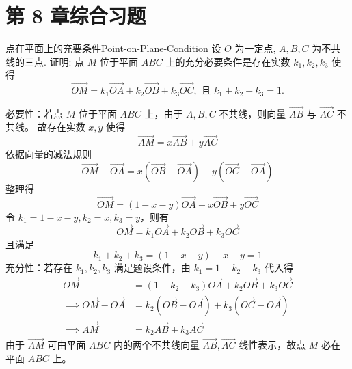 \section{第 8 章综合习题}

\begin{problem}{点在平面上的充要条件}{Point-on-Plane-Condition}
    设 $O$ 为一定点, $A, B, C$ 为不共线的三点. 证明: 点 $M$ 位于平面 $ABC$ 上的充分必要条件是存在实数 $k_1, k_2, k_3$ 使得
    \begin{equation}
        \overrightarrow{OM} = k_1\overrightarrow{OA} + k_2\overrightarrow{OB} + k_3\overrightarrow{OC}, \text{ 且 } k_1 + k_2 + k_3 = 1.
    \end{equation}
\end{problem}

\begin{myproof}
    必要性：若点 $M$ 位于平面 $ABC$ 上，由于 $A, B, C$ 不共线，则向量 $\overrightarrow{AB}$ 与 $\overrightarrow{AC}$ 不共线。
    故存在实数 $x, y$ 使得
    \begin{equation}
        \overrightarrow{AM} = x\overrightarrow{AB} + y\overrightarrow{AC}
    \end{equation}
    依据向量的减法规则
    \begin{equation}
        \overrightarrow{OM} - \overrightarrow{OA} = x(\overrightarrow{OB} - \overrightarrow{OA}) + y(\overrightarrow{OC} - \overrightarrow{OA})
    \end{equation}
    整理得
    \begin{equation}
        \overrightarrow{OM} = (1 - x - y)\overrightarrow{OA} + x\overrightarrow{OB} + y\overrightarrow{OC}
    \end{equation}
    令 $k_1 = 1 - x - y, k_2 = x, k_3 = y$，则有
    \begin{equation}
        \overrightarrow{OM} = k_1\overrightarrow{OA} + k_2\overrightarrow{OB} + k_3\overrightarrow{OC}
    \end{equation}
    且满足
    \begin{equation}
        k_1 + k_2 + k_3 = (1 - x - y) + x + y = 1
    \end{equation}
    充分性：若存在 $k_1, k_2, k_3$ 满足题设条件，由 $k_1 = 1 - k_2 - k_3$ 代入得
    \begin{equation}
        \begin{aligned}
            \overrightarrow{OM}                                & = (1 - k_2 - k_3)\overrightarrow{OA} + k_2\overrightarrow{OB} + k_3\overrightarrow{OC}            \\
            \implies \overrightarrow{OM} - \overrightarrow{OA} & = k_2(\overrightarrow{OB} - \overrightarrow{OA}) + k_3(\overrightarrow{OC} - \overrightarrow{OA}) \\
            \implies \overrightarrow{AM}                       & = k_2\overrightarrow{AB} + k_3\overrightarrow{AC}
        \end{aligned}
    \end{equation}
    由于 $\overrightarrow{AM}$ 可由平面 $ABC$ 内的两个不共线向量 $\overrightarrow{AB}, \overrightarrow{AC}$ 线性表示，故点 $M$ 必在平面 $ABC$ 上。
\end{myproof}


